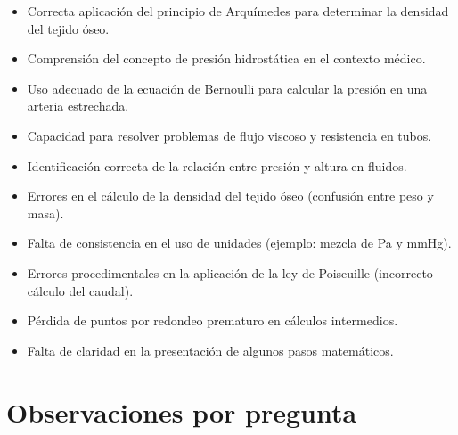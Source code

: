 \documentclass[11pt,a4paper]{article}
\begin{document}
\vspace{4pt}
\begin{minipage}[t]{0.48\linewidth}
  \begin{tcolorbox}[cajaFortaleza, title={Fortalezas}]
\begin{itemize}[leftmargin=1.5em, itemsep=2pt]
  \item Correcta aplicación del principio de Arquímedes para determinar la densidad del tejido óseo.
  \item Comprensión del concepto de presión hidrostática en el contexto médico.
  \item Uso adecuado de la ecuación de Bernoulli para calcular la presión en una arteria estrechada.
  \item Capacidad para resolver problemas de flujo viscoso y resistencia en tubos.
  \item Identificación correcta de la relación entre presión y altura en fluidos.
\end{itemize}
  \end{tcolorbox}
\end{minipage}
\hfill
\begin{minipage}[t]{0.48\linewidth}
  \begin{tcolorbox}[cajaMejora, title={Areas de mejora}]
\begin{itemize}[leftmargin=1.5em, itemsep=2pt]
  \item Errores en el cálculo de la densidad del tejido óseo (confusión entre peso y masa).
  \item Falta de consistencia en el uso de unidades (ejemplo: mezcla de Pa y mmHg).
  \item Errores procedimentales en la aplicación de la ley de Poiseuille (incorrecto cálculo del caudal).
  \item Pérdida de puntos por redondeo prematuro en cálculos intermedios.
  \item Falta de claridad en la presentación de algunos pasos matemáticos.
\end{itemize}
  \end{tcolorbox}
\end{minipage}

\section*{Observaciones por pregunta}
\end{document}
